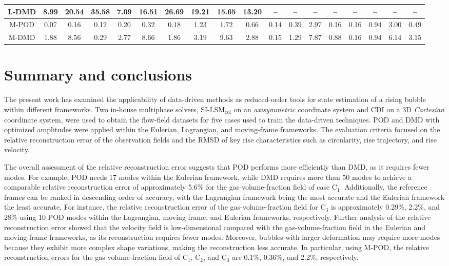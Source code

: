 \documentclass[a4paper,fleqn]{cas-sc}
\begin{document}
\begin{table}[!t]
\begin{center}
{\begin{tabular}{|c|ccc|ccc|ccc|cccc|cccc|}
					\hline
					L-DMD & 8.99 & 20.54 & 35.58 & 7.09 & 16.51 & 26.69 & 19.21 & 15.65 & 13.20 & -- & -- & -- & -- & -- & -- & -- & -- \\
					\hline
					M-POD & 0.07 & 0.16 & 0.12 & 0.20 & 0.32 & 0.18 & 1.23 & 1.72 & 0.66 & 0.14 & 0.39 & 2.97 & 0.16 & 0.16 & 0.94 & 3.00 & 0.49 \\
					\hline
					M-DMD & 1.88 & 8.56 & 0.29 & 2.77 & 8.66 & 1.86 & 3.19 & 9.63 & 2.88 & 0.15 & 1.29 & 7.87 & 0.88 & 0.16 & 0.94 & 6.14 & 3.15 \\
					\hline\hline
				\end{tabular}%
			}
			\label{tab:rmsd_summary_all_cases}
		\end{center}
	\end{table}
	
	\section{Summary and conclusions}
	\label{Conclusion}
	
	The present work has examined the applicability of data-driven methods as reduced-order tools for state estimation of a rising bubble within different frameworks. Two in-house multiphase solvers, SI-LSM$_{\text{col}}$ on an \textit{axisymmetric} coordinate system and CDI on a 3D \textit{Cartesian} coordinate system, were used to obtain the flow-field datasets for five cases used to train the data-driven techniques. POD and DMD with optimized amplitudes were applied within the Eulerian, Lagrangian, and moving-frame frameworks. The evaluation criteria focused on the relative reconstruction error of the observation fields and the RMSD of key rise characteristics such as circularity, rise trajectory, and rise velocity. 

	The overall assessment of the relative reconstruction error suggests that POD performs more efficiently than DMD, as it requires fewer modes. For example, POD needs 17 modes within the Eulerian framework, while DMD requires more than 50 modes to achieve a comparable relative reconstruction error of approximately 5.6\% for the gas-volume-fraction field of case C$_1$. Additionally, the reference frames can be ranked in descending order of accuracy, with the Lagrangian framework being the most accurate and the Eulerian framework the least accurate. For instance, the relative reconstruction error of the gas-volume-fraction field for C$_3$ is approximately 0.29\%, 2.2\%, and 28\% using 10 POD modes within the Lagrangian, moving-frame, and Eulerian frameworks, respectively. Further analysis of the relative reconstruction error showed that the velocity field is low-dimensional compared with the gas-volume-fraction field in the Eulerian and moving-frame frameworks, as its reconstruction requires fewer modes. Moreover, bubbles with larger deformation may require more modes because they exhibit more complex shape variations, making the reconstruction less accurate. In particular, using M-POD, the relative reconstruction errors for the gas-volume-fraction field of C$_1$, C$_2$, and C$_3$ are 0.1\%, 0.36\%, and 2.2\%, respectively.
	
\end{document}
